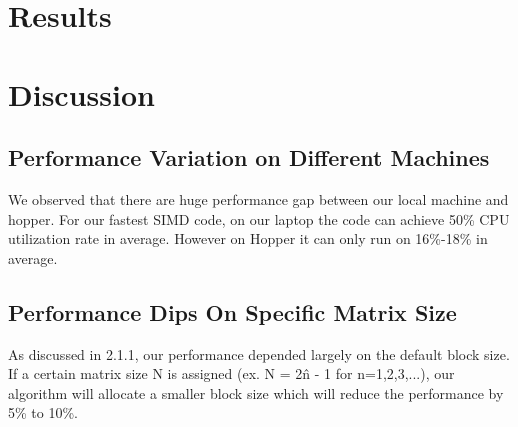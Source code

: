 \documentclass{article}
\begin{document}
\section{Results}
\label{sec:results}

\section{Discussion}
\subsection {Performance Variation on Different Machines}
We observed that there are huge performance gap between our local machine and hopper. For our fastest SIMD code, on our laptop the code can achieve 50\% CPU utilization rate in average. However on Hopper it can only run on 16\%-18\% in average.
\subsection {Performance Dips On Specific Matrix Size}
As discussed in 2.1.1, our performance depended largely on the default block size. If a certain matrix size N is assigned (ex. N = 2\^n - 1 for n=1,2,3,...), our algorithm will allocate a smaller block size which will reduce the performance by 5\% to 10\%.


%
%
\end{document}
